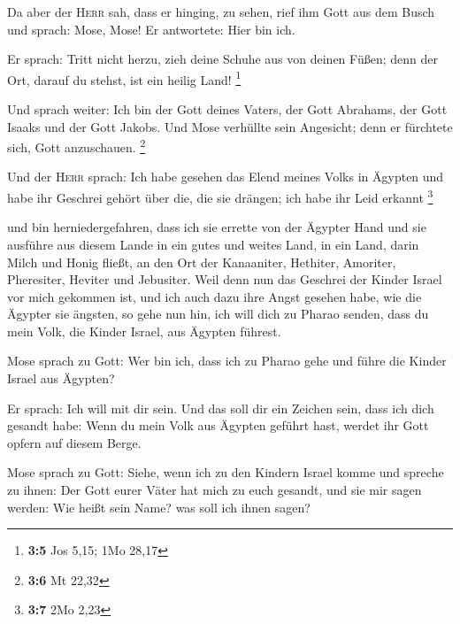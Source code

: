  Da aber der \textsc{Herr} sah, dass er hinging, zu sehen,
rief ihm Gott aus dem Busch und sprach: Mose, Mose! Er antwortete: Hier
bin ich.

 Er sprach: Tritt nicht herzu, zieh deine Schuhe aus von
deinen Füßen; denn der Ort, darauf du stehst, ist ein heilig Land!
\footnote{\textbf{3:5} Jos 5,15; 1Mo 28,17}

 Und sprach weiter: Ich bin der Gott deines Vaters, der
Gott Abrahams, der Gott Isaaks und der Gott Jakobs. Und Mose verhüllte
sein Angesicht; denn er fürchtete sich, Gott anzuschauen. \footnote{\textbf{3:6}
  Mt 22,32}

 Und der \textsc{Herr} sprach: Ich habe gesehen das Elend
meines Volks in Ägypten und habe ihr Geschrei gehört über die, die sie
drängen; ich habe ihr Leid erkannt \footnote{\textbf{3:7} 2Mo 2,23}

 und bin herniedergefahren, dass ich sie errette von der
Ägypter Hand und sie ausführe aus diesem Lande in ein gutes und weites
Land, in ein Land, darin Milch und Honig fließt, an den Ort der
Kanaaniter, Hethiter, Amoriter, Pheresiter, Heviter und Jebusiter.
 Weil denn nun das Geschrei der Kinder Israel vor mich
gekommen ist, und ich auch dazu ihre Angst gesehen habe, wie die Ägypter
sie ängsten,  so gehe nun hin, ich will dich zu Pharao
senden, dass du mein Volk, die Kinder Israel, aus Ägypten führest.

 Mose sprach zu Gott: Wer bin ich, dass ich zu Pharao
gehe und führe die Kinder Israel aus Ägypten?

 Er sprach: Ich will mit dir sein. Und das soll dir ein
Zeichen sein, dass ich dich gesandt habe: Wenn du mein Volk aus Ägypten
geführt hast, werdet ihr Gott opfern auf diesem Berge.

 Mose sprach zu Gott: Siehe, wenn ich zu den Kindern
Israel komme und spreche zu ihnen: Der Gott eurer Väter hat mich zu euch
gesandt, und sie mir sagen werden: Wie heißt sein Name? was soll ich
ihnen sagen?

